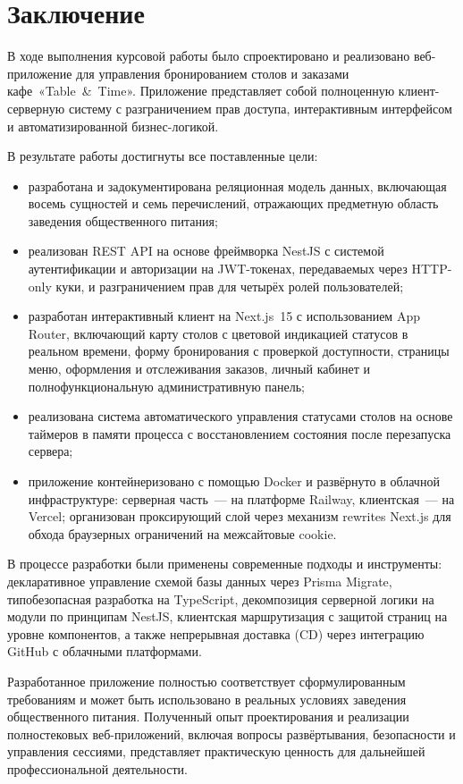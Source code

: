 \section*{Заключение}

В ходе выполнения курсовой работы было спроектировано и реализовано
веб-приложение для управления бронированием столов и заказами
кафе~«Table~\&~Time». Приложение представляет собой полноценную
клиент-серверную систему с разграничением прав доступа, интерактивным
интерфейсом и автоматизированной бизнес-логикой.

В результате работы достигнуты все поставленные цели:

\begin{itemize}
  \item разработана и задокументирована реляционная модель данных,
        включающая восемь сущностей и семь перечислений, отражающих
        предметную область заведения общественного питания;
  \item реализован REST API на основе фреймворка NestJS с системой
        аутентификации и авторизации на JWT-токенах, передаваемых через
        HTTP-only куки, и разграничением прав для четырёх ролей
        пользователей;
  \item разработан интерактивный клиент на Next.js~15 с использованием
        App Router, включающий карту столов с цветовой индикацией
        статусов в реальном времени, форму бронирования с проверкой
        доступности, страницы меню, оформления и отслеживания заказов,
        личный кабинет и полнофункциональную административную панель;
  \item реализована система автоматического управления статусами столов
        на основе таймеров в памяти процесса с восстановлением состояния
        после перезапуска сервера;
  \item приложение контейнеризовано с помощью Docker и развёрнуто
        в облачной инфраструктуре: серверная часть~--- на платформе
        Railway, клиентская~--- на Vercel; организован проксирующий
        слой через механизм rewrites Next.js для обхода браузерных
        ограничений на межсайтовые cookie.
\end{itemize}

В процессе разработки были применены современные подходы и инструменты:
декларативное управление схемой базы данных через Prisma Migrate,
типобезопасная разработка на TypeScript, декомпозиция серверной логики
на модули по принципам NestJS, клиентская маршрутизация с защитой
страниц на уровне компонентов, а также непрерывная доставка (CD) через
интеграцию GitHub с облачными платформами.

Разработанное приложение полностью соответствует сформулированным
требованиям и может быть использовано в реальных условиях заведения
общественного питания. Полученный опыт проектирования и реализации
полностековых веб-приложений, включая вопросы развёртывания,
безопасности и управления сессиями, представляет практическую ценность
для дальнейшей профессиональной деятельности.